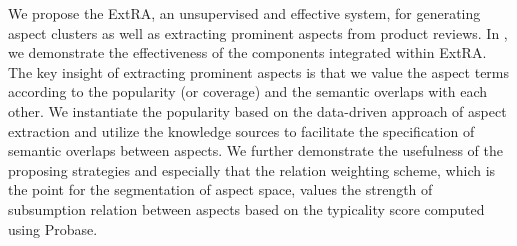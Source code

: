 We propose the ExtRA, an unsupervised
and effective system, for generating aspect clusters
as well as extracting prominent aspects from product reviews.
In , 
we demonstrate the effectiveness of 
the components integrated within ExtRA.
The key insight of extracting prominent aspects
is that we value the aspect terms according to
the popularity (or coverage) and the semantic overlaps with each other.
We instantiate the popularity based on the data-driven approach of 
aspect extraction
and utilize the knowledge sources to facilitate 
the specification of semantic overlaps between aspects.
We further demonstrate the usefulness of the proposing strategies
and especially that the relation weighting scheme, which is the point for
the segmentation of aspect space, values the strength of 
subsumption relation between aspects based on the 
typicality score computed using Probase.






